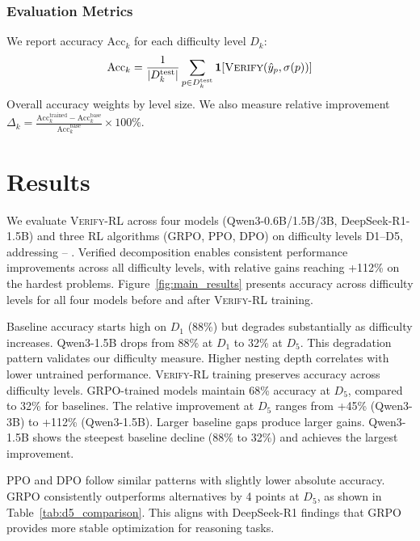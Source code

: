 \documentclass[a4paper,fleqn]{cas-dc}
\theoremstyle{definition}
\newcommand{\rectgreen}[1]{%
  \tikz[baseline=(char.base)]{
    \node[shape=rectangle,rounded corners=2pt,fill=ForestGreen,inner sep=1.5pt,minimum height=1.2em] (char) {\textcolor{white}{#1}};
  }%
}
\begin{document}
\subsubsection{Evaluation Metrics}
We report accuracy $\text{Acc}_k$ for each difficulty level $D_k$:
\begin{equation}
\text{Acc}_k = \frac{1}{|D_k^{\text{test}}|} \sum_{p \in D_k^{\text{test}}} \mathbf{1}[\textsc{Verify}(\hat{y}_p, \sigma(p))]
\end{equation}
Overall accuracy weights by level size. We also measure relative improvement $\Delta_k = \frac{\text{Acc}_k^{\text{trained}} - \text{Acc}_k^{\text{base}}}{\text{Acc}_k^{\text{base}}} \times 100\%$.

\section{Results}
\label{sec:results}
We evaluate \textsc{Verify-RL} across four models (Qwen3-0.6B/1.5B/3B, DeepSeek-R1-1.5B) and three RL algorithms (GRPO, PPO, DPO) on difficulty levels D1--D5, addressing \rectgreen{RQ1}--\rectgreen{RQ4}. Verified decomposition enables consistent performance improvements across all difficulty levels, with relative gains reaching +112\% on the hardest problems. Figure~\ref{fig:main_results} presents accuracy across difficulty levels for all four models before and after \textsc{Verify-RL} training.

Baseline accuracy starts high on $D_1$ (88\%) but degrades substantially as difficulty increases. Qwen3-1.5B drops from 88\% at $D_1$ to 32\% at $D_5$. This degradation pattern validates our difficulty measure. Higher nesting depth correlates with lower untrained performance. \textsc{Verify-RL} training preserves accuracy across difficulty levels. GRPO-trained models maintain 68\% accuracy at $D_5$, compared to 32\% for baselines. The relative improvement at $D_5$ ranges from +45\% (Qwen3-3B) to +112\% (Qwen3-1.5B). Larger baseline gaps produce larger gains. Qwen3-1.5B shows the steepest baseline decline (88\% to 32\%) and achieves the largest improvement.

PPO and DPO follow similar patterns with slightly lower absolute accuracy. GRPO consistently outperforms alternatives by 4 points at $D_5$, as shown in Table~\ref{tab:d5_comparison}. This aligns with DeepSeek-R1 findings that GRPO provides more stable optimization for reasoning tasks.
\end{document}
